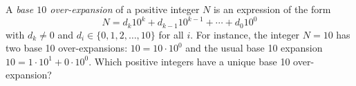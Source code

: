 A \emph{base $10$ over-expansion} of a positive integer $N$ is an expression of the form
\[
N = d_k 10^k + d_{k-1} 10^{k-1} + \cdots + d_0 10^0
\]
with $d_k \neq 0$ and $d_i \in \{0,1,2,\dots,10\}$ for all $i$.
For instance, the integer $N = 10$ has two base 10 over-expansions: $10 = 10 \cdot 10^0$
and the usual base 10 expansion $10 = 1 \cdot 10^1 + 0 \cdot 10^0$.
Which positive integers have a unique base 10 over-expansion?
